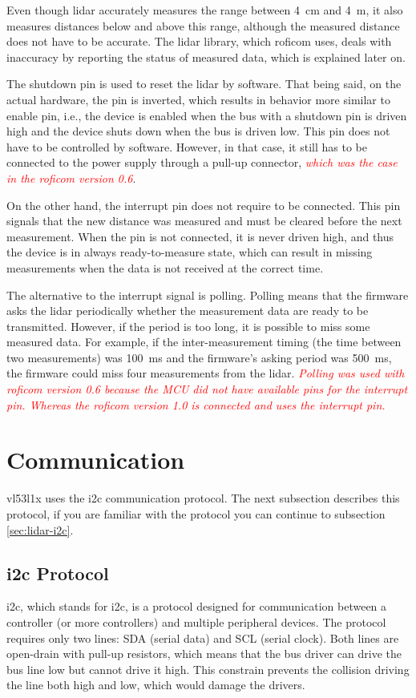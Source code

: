 \documentclass[
  digital,     %
  oneside,     %
  nosansbold,  %
  nocolorbold, %
  lof,         %
  lot,         %
]{fithesis4}
\newcommand{\TODO}[1]{\textcolor{red}{\textit{#1}}}
\begin{document}
{{{Even though \acrshort{lidar} accurately measures the range between \qty{4}{\centi\metre} and \qty{4}{\metre}, it also measures distances below and above this range, although the measured distance does not have to be accurate. The lidar library, which \acrshort{roficom} uses, deals with inaccuracy by reporting the status of measured data, which is explained later on.

The shutdown pin is used to reset the \acrshort{lidar} by software. That being said, on the actual hardware, the pin is inverted, which results in behavior more similar to enable pin, i.e., the device is enabled when the bus with a shutdown pin is driven high and the device shuts down when the bus is driven low. This pin does not have to be controlled by software. However, in that case, it still has to be connected to the power supply through a pull-up connector, \TODO{which was the case in the \acrshort{roficom} version 0.6}.

On the other hand, the interrupt pin does not require to be connected. This pin signals that the new distance was measured and must be cleared before the next measurement. When the pin is not connected, it is never driven high, and thus the device is in always ready-to-measure state, which can result in missing measurements when the data is not received at the correct time.

The alternative to the interrupt signal is polling. Polling means that the firmware asks the \acrshort{lidar} periodically whether the measurement data are ready to be transmitted. However, if the period is too long, it is possible to miss some measured data. For example, if the inter-measurement timing (the time between two measurements) was \qty{100}{\milli\second} and the firmware's asking period was \qty{500}{\milli\second}, the firmware could miss four measurements from the \acrshort{lidar}. \TODO{Polling was used with \acrshort{roficom} version 0.6 because the MCU did not have available pins for the interrupt pin. Whereas the \acrshort{roficom} version 1.0 is connected and uses the interrupt pin.}

\section{ Communication }
\gls{vl53l1x} uses the \acrshort{i2c} communication protocol. The next subsection describes this protocol, if you are familiar with the protocol you can continue to subsection \ref{sec:lidar-i2c}.

\subsection[ Inter-Integrated Circuit Protocol ]{ \acrlong{i2c} Protocol } \label{sec:i2c}
\acrshort{i2c}, which stands for \acrlong{i2c}, is a protocol designed for communication between a controller (or more controllers) and multiple peripheral devices. The protocol requires only two lines: SDA (serial data) and SCL (serial clock). Both lines are open-drain with pull-up resistors, which means that the bus driver can drive the bus line low but cannot drive it high. This constrain prevents the collision  driving the line both high and low, which would damage the drivers.

}}}
\end{document}

